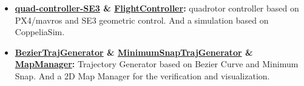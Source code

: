 \documentclass[11pt,a4paper,sans]{moderncv}        %
\begin{document}
\begin{itemize}


\item \textbf{\href{https://github.com/jianhengLiu/quad_controller_SE3}{quad-controller-SE3} \& \href{https://github.com/jianhengLiu/FlightController}{FlightController}:} quadrotor controller based on PX4/mavros and SE3 geometric control. And a simulation based on CoppeliaSim. 




\item \textbf{\href{https://github.com/jianhengLiu/BezierTrajGenerator}{BezierTrajGenerator} \& \href{https://github.com/jianhengLiu/MinimumSnapTrajGenerator}{MinimumSnapTrajGenerator} \& 
\href{https://github.com/jianhengLiu/MapManager}{MapManager}:} Trajectory Generator based on Bezier Curve and Minimum Snap. And a 2D Map Manager for the verification and visualization.



\end{itemize}
\end{document}
